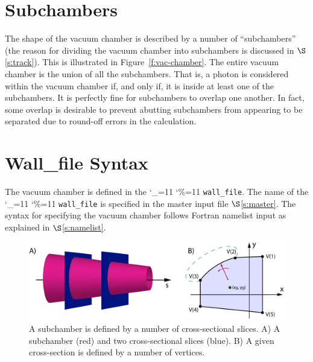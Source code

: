 \documentclass[11pt,openany]{report}
\newcommand{\sref}[1]{$\S$\ref{#1}}
\newcommand\ttcmd{\begingroup\catcode`\_=11 \catcode`\%=11 \dottcmd}
\newcommand\dottcmd[1]{\texttt{#1}\endgroup}
\newcommand{\fig}[1]{Figure~\ref{#1}}
\newcommand{\vn}{\ttcmd}
\begin{document}
\section{Subchambers}
\label{s:sub.chambers}

The shape of the vacuum chamber is described by a number of ``subchambers'' (the reason
for dividing the vacuum chamber into subchambers is discussed in \sref{s:track}). This is
illustrated in \fig{f:vac-chamber}. The entire vacuum chamber is the union of all the
subchambers. That is, a photon is considered within the vacuum chamber if, and only if,
it is inside at least one of the subchambers. It is perfectly fine for subchambers to
overlap one another. In fact, some overlap is desirable to prevent abutting subchambers
from appearing to be separated due to round-off errors in the calculation.

\section{Wall_file Syntax}
\label{s:wall.file}

The vacuum chamber is defined in the \vn{wall_file}. The name of the \vn{wall_file} is
specified in the master input file \sref{s:master}. The syntax for specifying the vacuum
chamber follows Fortran namelist input as explained in \sref{s:namelist}.

  \begin{figure}[tb]
  \begin{center}
  \includegraphics[width=6in]{chamber-wall.pdf} 
\caption{A subchamber is defined by a number of cross-sectional slices. A) A subchamber
(red) and two cross-sectional slices (blue). B) A given cross-section is defined by a
number of vertices.}
  \label{f:chamber.wall}
  \end{center}
  \end{figure}
\end{document}
